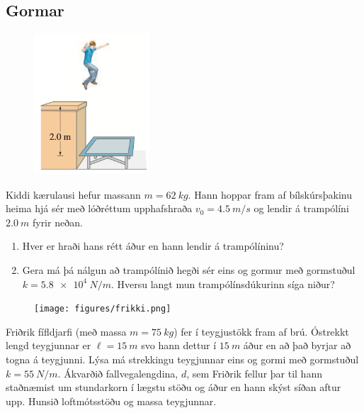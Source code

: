 \begin{enumerate}[label = \textbf{Dæmi \thechapter.\arabic*.}]
\subsection*{Gormar}
    
\begin{minipage}{\linewidth}
\begin{figure}
\vspace{-1.5cm}
\includegraphics[width=1.7in]{images/hopp.png}
\end{figure}
    
    \item Kiddi kærulausi hefur massann $m = \SI{62}{kg}$. Hann hoppar fram af bílskúrsþakinu heima hjá sér með lóðréttum upphafshraða $v_0 = \SI{4.5}{m/s}$ og lendir á trampólíni $\SI{2.0}{m}$ fyrir neðan. 
    
    \begin{enumerate}[label = \textbf{(\alph*)}]
        \item Hver er hraði hans rétt áður en hann lendir á trampólíninu?
        
        \item Gera má þá nálgun að trampólínið hegði sér eins og gormur með gormstuðul $k = \SI{5.8e4}{N/m}$. Hversu langt mun trampólínsdúkurinn síga niður?
    \end{enumerate}
    
    \end{minipage}
    
\begin{minipage}{\linewidth}
\begin{figure}
\vspace{1cm}
\texttt{[image: figures/frikki.png]}
\end{figure}
    
    \item Friðrik fífldjarfi (með massa $m = \SI{75}{kg}$) fer í teygjustökk fram af brú. Óstrekkt lengd teygjunnar er $\ell = \SI{15}{m}$ svo hann dettur í $\SI{15}{m}$ áður en að það byrjar að togna á teygjunni. Lýsa má strekkingu teygjunnar eins og gormi með gormstuðul $k = \SI{55}{N/m}$. Ákvarðið fallvegalengdina, $d$, sem Friðrik fellur þar til hann staðnæmist um stundarkorn í lægstu stöðu og áður en hann skýst síðan aftur upp. Hunsið loftmótsstöðu og massa teygjunnar.
    

\end{minipage}
\end{enumerate}

